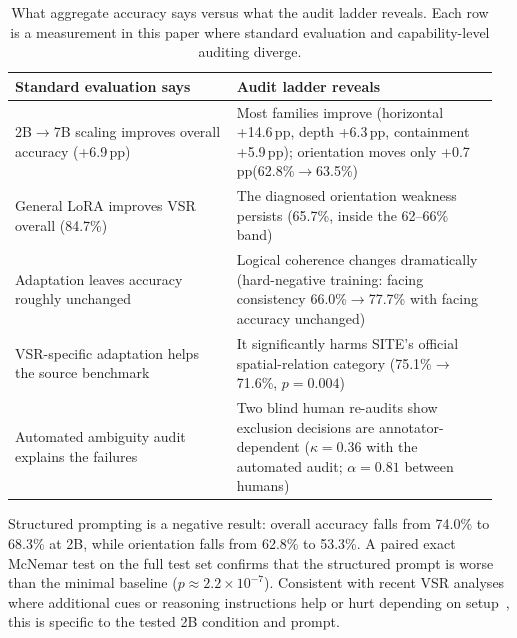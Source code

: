 \documentclass[10pt,twocolumn,letterpaper]{article}
\newcommand{\pp}{\,pp}
\begin{document}
\begin{table}[t]
\centering
\footnotesize
\caption{What aggregate accuracy says versus what the audit ladder reveals. Each row is a measurement in this paper where standard evaluation and capability-level auditing diverge.}
\label{tab:audit-vs-accuracy}
\begin{tabular}{@{}p{0.44\linewidth}p{0.52\linewidth}@{}}
\toprule
\textbf{Standard evaluation says} & \textbf{Audit ladder reveals} \\
\midrule
2B$\rightarrow$7B scaling improves overall accuracy (+6.9\pp) & Most families improve (horizontal +14.6\pp, depth +6.3\pp, containment +5.9\pp); orientation moves only +0.7\pp (62.8\%$\rightarrow$63.5\%) \\
General LoRA improves VSR overall (84.7\%) & The diagnosed orientation weakness persists (65.7\%, inside the 62--66\% band) \\
Adaptation leaves accuracy roughly unchanged & Logical coherence changes dramatically (hard-negative training: facing consistency 66.0\%$\rightarrow$77.7\% with facing accuracy unchanged) \\
VSR-specific adaptation helps the source benchmark & It significantly harms SITE's official spatial-relation category (75.1\%$\rightarrow$71.6\%, $p{=}0.004$) \\
Automated ambiguity audit explains the failures & Two blind human re-audits show exclusion decisions are annotator-dependent ($\kappa{=}0.36$ with the automated audit; $\alpha{=}0.81$ between humans) \\
\bottomrule
\end{tabular}
\end{table}

Structured prompting is a negative result: overall accuracy falls from 74.0\% to 68.3\% at 2B, while orientation falls from 62.8\% to 53.3\%. A paired exact McNemar test on the full test set confirms that the structured prompt is worse than the minimal baseline ($p\approx2.2\times10^{-7}$). Consistent with recent VSR analyses where additional cues or reasoning instructions help or hurt depending on setup~\cite{akasaka2026whenmore}, this is specific to the tested 2B condition and prompt.
\end{document}
